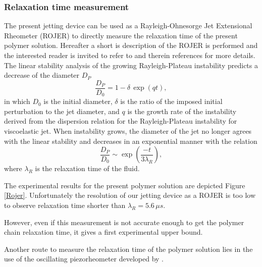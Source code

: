 \documentclass[twocolumn,10pt]{asme2ej}
\begin{document}
\subsubsection*{Relaxation time measurement}
The present jetting device can be used as a Rayleigh-Ohnesorge Jet Extensional Rheometer (ROJER) \cite{keshavarz2015studying} to directly measure the relaxation time of the present polymer solution. Hereafter a short is description of the ROJER is performed and the interested reader is invited to refer to \cite{keshavarz2015studying} and therein references for more details.
\\
The linear stability analysis of the growing Rayleigh-Plateau instability predicts a decrease of the diameter $D_P$
\begin{equation}
    \frac{D_P}{D_0}=1-\delta \, \exp(qt),
    \label{veDecay}
\end{equation}
in which $D_0$ is the initial diameter, $\delta$ is the ratio of the imposed initial perturbation to the jet diameter, and $q$ is the growth rate of the instability derived from the dispersion relation for the Rayleigh-Plateau instability for viscoelastic jet. When instability grows, the diameter of the jet no longer agrees with the linear stability and decreases in an exponential manner with the relation 
\begin{equation}
    \frac{D_P}{D_0} \sim \exp\left(\frac{-t}{3\lambda_R}\right),
\end{equation} 
where $\lambda_R$ is the relaxation time of the fluid.

The experimental results for the present polymer solution are depicted Figure \ref{Rojer}. Unfortunately the resolution of our jetting device as a ROJER is too low to observe relaxation time shorter than $\lambda_R=5.6 \, \mu s$.

However, even if this measurement is not accurate enough to get the polymer chain relaxation time, it gives a first experimental upper bound.

Another route to measure the relaxation time of the polymer solution lies in the use of the oscillating piezorheometer developed by \cite{buchanan2005high}. 
\end{document}
